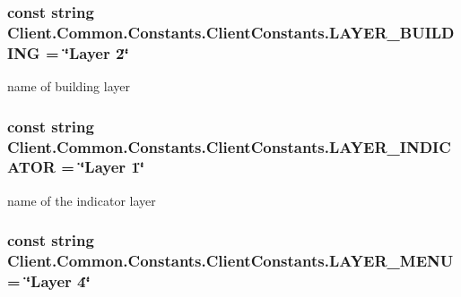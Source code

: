 \subsubsection[{L\+A\+Y\+E\+R\+\_\+\+B\+U\+I\+L\+D\+I\+N\+G}]{\setlength{\rightskip}{0pt plus 5cm}const string Client.\+Common.\+Constants.\+Client\+Constants.\+L\+A\+Y\+E\+R\+\_\+\+B\+U\+I\+L\+D\+I\+N\+G = \char`\"{}Layer 2\char`\"{}}\label{classClient_1_1Common_1_1Constants_1_1ClientConstants_a554dac3f46ee3f79accab315232412ec}


name of building layer 

\hypertarget{classClient_1_1Common_1_1Constants_1_1ClientConstants_a5eb5be4e8272c211a2c23c1a7bf50ac4}{}
\subsubsection[{L\+A\+Y\+E\+R\+\_\+\+I\+N\+D\+I\+C\+A\+T\+O\+R}]{\setlength{\rightskip}{0pt plus 5cm}const string Client.\+Common.\+Constants.\+Client\+Constants.\+L\+A\+Y\+E\+R\+\_\+\+I\+N\+D\+I\+C\+A\+T\+O\+R = \char`\"{}Layer 1\char`\"{}}\label{classClient_1_1Common_1_1Constants_1_1ClientConstants_a5eb5be4e8272c211a2c23c1a7bf50ac4}


name of the indicator layer 

\hypertarget{classClient_1_1Common_1_1Constants_1_1ClientConstants_a02a25d01ffc1924cfc18976eca525190}{}
\subsubsection[{L\+A\+Y\+E\+R\+\_\+\+M\+E\+N\+U}]{\setlength{\rightskip}{0pt plus 5cm}const string Client.\+Common.\+Constants.\+Client\+Constants.\+L\+A\+Y\+E\+R\+\_\+\+M\+E\+N\+U = \char`\"{}Layer 4\char`\"{}}\label{classClient_1_1Common_1_1Constants_1_1ClientConstants_a02a25d01ffc1924cfc18976eca525190}


